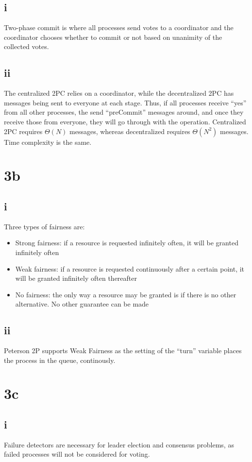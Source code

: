 \documentclass[a4paper,10pt,]{report}
\begin{document}
\subsection{i}
Two-phase commit is where all processes send votes to a coordinator and the coordinator chooses whether to commit or not based on unanimity of the collected votes.
\subsection{ii}
The centralized 2PC relies on a coordinator, while the decentralized 2PC has messages being sent to everyone at each stage.  Thus, if all processes receive ``yes'' from all other processes, the send ``preCommit'' messages around, and once they receive those from everyone, they will go through with the operation.  Centralized 2PC requires $\Theta(N)$ messages, whereas decentralized requires $\Theta(N^2)$ messages.  Time complexity is the same.
\section{3b}
\subsection{i}
Three types of fairness are:
\begin{itemize}
\item Strong fairness: if a resource is requested infinitely often, it will be granted infinitely often
\item Weak fairness: if a resource is requested continuously after a certain point, it will be granted infinitely often thereafter
\item No fairness: the only way a resource may be granted is if there is no other alternative.  No other guarantee can be made
\end{itemize}
\subsection{ii}
Peterson 2P supports Weak Fairness as the setting of the ``turn'' variable places the process in the queue, continously.
\section{3c}
\subsection{i}
Failure detectors are necessary for leader election and consensus problems, as failed processes will not be considered for voting.  
\end{document}
